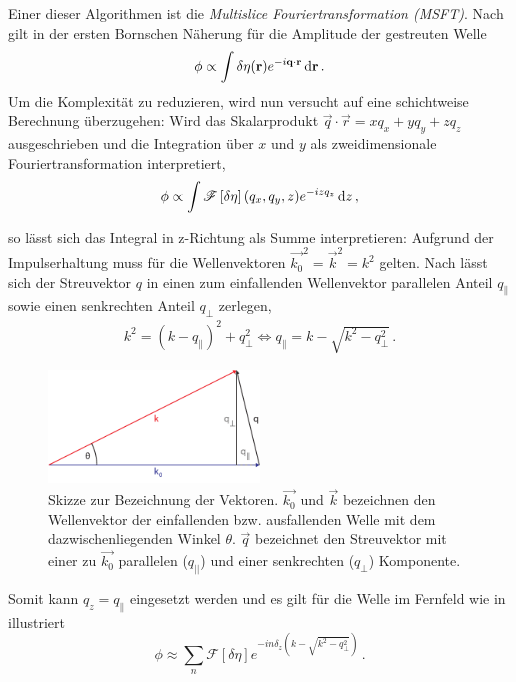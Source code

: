 Einer dieser Algorithmen ist die \textit{Multislice Fouriertransformation (MSFT)}. Nach  gilt in der ersten Bornschen Näherung für die Amplitude der gestreuten Welle
\begin{equation}
	\phi\propto\int \delta\eta(\vec{r}) e^{-i\vec{q}\cdot \vec{r}} \dif \vec{r} \, .
\end{equation}
Um die Komplexität zu reduzieren, wird nun versucht auf eine schichtweise Berechnung überzugehen: Wird das Skalarprodukt $\vec{q}\cdot \vec{r}=xq_x+yq_y+zq_z$ ausgeschrieben und die Integration über $x$ und $y$ als zweidimensionale Fouriertransformation interpretiert,
\begin{equation}
	\phi\propto\int \mathscr{F}\left[\delta\eta\right](q_x,q_y,z) e^{-izq_z} \dif z \, ,
\end{equation}

so lässt sich das Integral in z-Richtung als Summe interpretieren:
Aufgrund der Impulserhaltung muss für die Wellenvektoren $\vec{k_0}^2=\vec{k}^2=k^2$ gelten. Nach   lässt sich der Streuvektor $q$ in einen zum einfallenden Wellenvektor parallelen Anteil $q_\parallel$ sowie einen senkrechten Anteil $q_\perp$ zerlegen,
\begin{align}
	k^2=(k-q_\parallel)^2+q_{\perp}^2                  
	\Leftrightarrow q_\parallel=k-\sqrt{k^2-q_\perp^2} \,.
\end{align}
\begin{figure}
	\centering
	\includegraphics[width=0.5\textwidth]{images/vec_msft.pdf}
	\caption[Vektoren bei MSFT]{Skizze zur Bezeichnung der Vektoren. $\vec{k_{0}}$ und $\vec{k}$ bezeichnen den Wellenvektor der einfallenden bzw. ausfallenden Welle mit dem dazwischenliegenden Winkel $\theta$. $\vec{q}$ bezeichnet den Streuvektor mit einer zu $\vec{k_{0}}$ parallelen ($q_{||}$) und einer senkrechten ($q_\perp$) Komponente.}
	\label{fig:vec_msft}
\end{figure} 

Somit kann $q_z=q_\parallel$ eingesetzt werden und es gilt für die Welle im Fernfeld wie in  illustriert
\begin{equation}
	\label{eq:msft}
	\phi\approx\sum_n{\mathscr{F}\left[\delta\eta\right] e^{-in\delta_z\left(k-\sqrt{k^2-q_\perp^2}\right) }} \, .
\end{equation}

